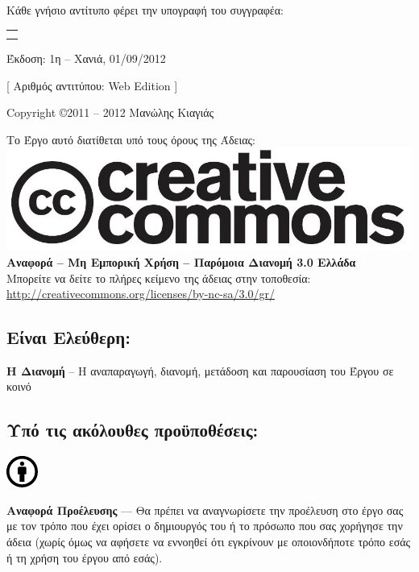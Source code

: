 %
%
\maketitle
\begin{center}
Κάθε γνήσιο αντίτυπο φέρει την υπογραφή του συγγραφέα:
\begin{tabular}{p{}}
\\
\\
\\
\end{tabular}

\bigskip
Έκδοση: 1η -- Χανιά, 01/09/2012

[ Αριθμός αντιτύπου: Web Edition ]

\bigskip
Copyright \copyright 2011 -- 2012 Μανώλης Κιαγιάς

Το Έργο αυτό διατίθεται υπό τους όρους της Άδειας:\\
\includegraphics[scale=0.2]{images/license/cc-logo}\\
\textbf{Αναφορά -- Μη Εμπορική Χρήση --  Παρόμοια Διανομή 3.0 Ελλάδα}\\
Μπορείτε να δείτε το πλήρες κείμενο της άδειας στην τοποθεσία:\\
\url{http://creativecommons.org/licenses/by-nc-sa/3.0/gr/}
\end{center}
\newpage
\subsection*{Είναι Ελεύθερη:}

\noindent
\textbf{Η Διανομή} -- Η αναπαραγωγή, διανομή, μετάδοση και παρουσίαση του Έργου σε κοινό

\subsection*{Υπό τις ακόλουθες προϋποθέσεις:}

\vspace{1em}
\noindent
\parbox{1.5cm}{\includegraphics[scale=1.5]{images/license/cc_by_30}}
\parbox{10.5cm}{\textbf{Αναφορά Προέλευσης} — Θα πρέπει να αναγνωρίσετε την προέλευση στο έργο σας με τον τρόπο που έχει ορίσει ο δημιουργός του ή το πρόσωπο που σας χορήγησε την άδεια (χωρίς όμως να αφήσετε να εννοηθεί  ότι εγκρίνουν  με οποιονδήποτε τρόπο εσάς ή τη χρήση του έργου από εσάς).}

